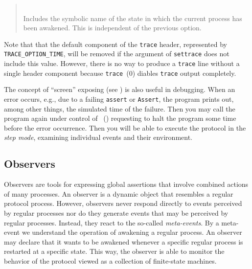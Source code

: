 \begin{quote}
\noindent{}\\ \hspace{0in}
Includes the symbolic name of the state in which the current
process has been awakened.
This is independent of the previous option.
\end{quote}

Note that that the default component of the {\tt trace} header, represented by
{\tt TRACE\_OPTION\_TIME}, will be removed if the argument of {\tt settrace}
does not include this value.
However, there is no way to produce a {\tt trace} line without a single header
component because {\tt trace}~{(0)} diables {\tt trace} output completely.

The concept of ``screen'' exposing (see )
is also useful in debugging.
When an error occurs, e.g.,
due to a failing {\tt assert} or {\tt Assert}, the program prints out,
among other things, the simulated time of the failure.
Then you may call the program again under control of \dsd\
() requesting to halt the program some time before
the error occurrence.
Then you will be able to execute the protocol in the {\em step mode},
examining individual events and their environment.

\subsection{Observers}
\label{rm_ob_ob}

Observers are tools for expressing global assertions that involve combined
actions of many processes.
An observer is a dynamic object that resembles a regular protocol process.
However,
observers never respond directly to events perceived by regular processes
nor do they generate events that may be perceived by regular processes.
Instead, they react to the so-called {\em meta-events}.
By a meta-event we understand the operation of awakening a regular process.
An observer may declare that it wants to be awakened whenever a specific
regular process is restarted at a specific state.
This way, the observer is able to monitor the behavior of the protocol viewed
as a collection of finite-state machines.

